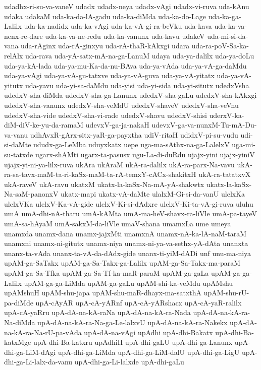{udadhx-ri-su-va-vaneV
udadx
udadx-neya
udadx-vAgi
udadx-vi-ruva
uda-kAnu
udaka
udakaM
uda-ka-da-lA-gadu
uda-ka-diMda
uda-ka-do-Lage
uda-ka-ga-Lalilx
uda-ka-nadidx
uda-ka-vAgi
uda-ka-vA-gi-ra-beVku
uda-kava
uda-ka-va-nenx-re-dare
uda-ka-va-ne-redu
uda-ka-vanunx
uda-kavu
udakeV
uda-mi-si-da-vana
uda-rAginx
uda-rA-ginxyu
uda-rA-thaR-kAkxgi
udara
uda-ra-poV-Sa-ka-relAlx
uda-rava
uda-yA-satx-mA-na-ga-LanuM
udaya
uda-ya-dalilx
uda-ya-doLu
uda-ya-kA-lada
uda-ya-mu-Ka-da-nu-BAva
uda-ya-vAda
uda-ya-vA-ga-daMdu
uda-ya-vAgi
uda-ya-vA-gu-tatxve
uda-ya-vA-guva
uda-ya-vA-yitatx
uda-ya-vA-yitutx
uda-yavu
uda-yi-sa-daMdu
uda-yisi
uda-yi-sida
uda-yi-situtx
udedxVsha
udedxV-sha-diMda
udedxV-sha-ga-Lanunx
udedxV-sha-gaLu
udedxV-sha-kAkxgi
udedxV-sha-vanunx
udedxV-sha-veMdU
udedxV-shaveV
udedxV-sha-veVnu
udedxV-sha-vide
udedxV-sha-vi-rade
udedxV-shavu
udedxV-shisi
uderxV-ka-diM-diV-ke-yu-da-ramaM
udevxV-ga-ja-nakaH
udevxV-ga-va-nunxM-Tu-mA-Du-va-vanu
udhAvxR-gArx-sitx-yaR-ga-payxtha
udiV-ritaH
udidxV-pi-su-vudu
udi-si-daMte
ududx-ga-LeMba
uduyxkatx
uepe
uga-ma-sAthx-na-ga-LalelxV
uga-mi-su-tatxde
ugarx-shAMti
ugarx-ta-pasusx
ugu-La-di-duRdu
ujajx-yini
ujajx-yiniV
ujajx-yi-ni-ya-lilx-ruva
ukAra
ukAraM
ukA-ra-dalilx
ukA-ra-parx-Na-vavu
ukA-ra-sa-tavx-maM-ta-ri-kaSx-maM-ta-rA-temxY-cACx-shakitxH
ukA-ra-tatatxvX
ukA-raveV
ukA-ravu
ukatxM
ukatx-la-kaSx-Na-mA-yA-shakwtx
ukatx-la-kaSx-Na-saM-panonxV
ukatx-mapi
ukatx-vA-daMte
ulalxM-Gi-si-da-vanU
ulelxKa
ulelxVKa
ulelxV-Ka-vA-gide
ulelxV-Ki-si-dAdxre
ulelxV-Ki-ta-vA-gi-ruva
uluhu
umA
umA-dhi-nA-tharu
umA-kAMta
umA-ma-heV-shavx-ra-liVle
umA-pa-tayeV
umA-sa-hAyaM
umA-sakxM-da-liVle
umaV-shana
umamxLa
ume
umeya
unamxda
unamx-dana
unamx-jajxMti
unamxnA
unamx-nA-ka-lA-naM-taraM
unamxni
unamx-ni-gitutx
unamx-niya
unamx-ni-ya-va-sethx-yA-dAta
unanxta
unanx-ta-vAda
unanx-ta-vA-da-dAdx-gide
unanx-ti-yiM-dADi
unf
unu-ma-niya
upAM-ga-SaTakx
upAM-ga-Sa-Takx-ga-Lalilx
upAM-ga-Sa-Takx-ma-paraM
upAM-ga-Sa-Tfka
upAM-ga-Sa-Tf-ka-maR-paraM
upAM-ga-gaLa
upAM-ga-ga-Lalilx
upAM-ga-ga-LiMda
upAM-ga-gaLu
upAM-shi-ka-veMdu
upAMshu
upAMshuH
upAM-shu-japa
upAM-shu-maR-dhayx-ma-satxthA
upAM-shu-rU-pa-diMde
upA-cAyAR
upA-cA-yARnf
upA-cA-yARshacx
upA-cA-yaR-ralilx
upA-cA-yaRru
upA-dA-na-kA-raNa
upA-dA-na-kA-ra-Nada
upA-dA-na-kA-ra-Na-diMda
upA-dA-na-kA-ra-Na-ga-Le-lalxvU
upA-dA-na-kA-ra-Nakekx
upA-dA-na-kA-ra-Na-rU-pa-vAda
upA-dA-na-vAgi
upAdhi
upA-dhi-Bakatx
upA-dhi-Ba-katxMge
upA-dhi-Ba-katxru
upAdhiH
upA-dhi-gaLU
upA-dhi-ga-Lanunx
upA-dhi-ga-LiM-dAgi
upA-dhi-ga-LiMda
upA-dhi-ga-LiM-dalU
upA-dhi-ga-LigU
upA-dhi-ga-Li-lalx-da-vanu
upA-dhi-ga-Li-lalxde
upA-dhi-gaLu
}
